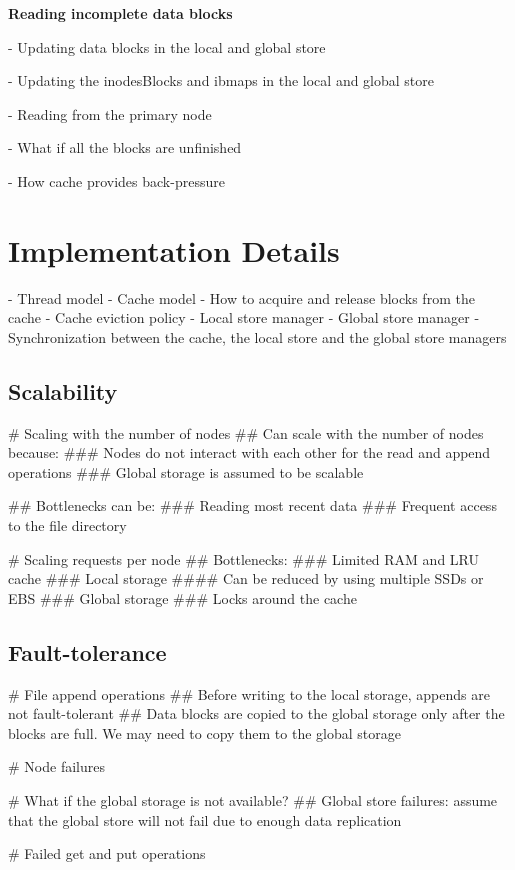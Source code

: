 \documentclass[]{article}
\newcommand{\subtopic}[1]{\vspace{1.5pt} \noindent \textbf{#1}}
\begin{document}
\subtopic{Reading incomplete data blocks}



- Updating data blocks in the local and global store

- Updating the inodesBlocks and ibmaps in the local and global store

- Reading from the primary node

- What if all the blocks are unfinished

- How cache provides back-pressure



\section{Implementation Details}

- Thread model
- Cache model
  - How to acquire and release blocks from the cache
  - Cache eviction policy
- Local store manager
- Global store manager
- Synchronization between the cache, the local store and the global store managers


\subsection{Scalability}

\begin{easylist}[itemize]

  # Scaling with the number of nodes
    ## Can scale with the number of nodes because:
      ### Nodes do not interact with each other for the read and append operations
      ### Global storage is assumed to be scalable

    ## Bottlenecks can be:
      ### Reading most recent data
      ### Frequent access to the file directory

  # Scaling requests per node
    ## Bottlenecks:
      ### Limited RAM and LRU cache
      ### Local storage
        #### Can be reduced by using multiple SSDs or EBS
      ### Global storage
      ### Locks around the cache

\end{easylist}

\subsection{Fault-tolerance}

\begin{easylist}[itemize]

# File append operations
  ## Before writing to the local storage, appends are not fault-tolerant
  ## Data blocks are copied to the global storage only after the blocks are full. We may need to copy
     them to the global storage

# Node failures

# What if the global storage is not available?
  ## Global store failures: assume that the global store will not fail due to enough data replication

# Failed get and put operations


\end{easylist}
\end{document}
